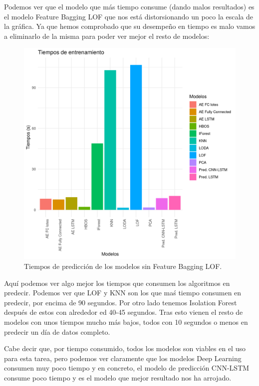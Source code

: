 Podemos ver que el modelo que más tiempo consume (dando malos resultados) es el modelo Feature Bagging LOF que nos está distorsionando un poco la escala de la gráfica. Ya que hemos comprobado que su desempeño en tiempo es malo vamos a eliminarlo de la misma para poder ver mejor el resto de modelos:

\begin{figure}[H]
	\centering
	\includegraphics[scale=0.65]{imagenes/tiempos_prediccion2.png}
	\caption{Tiempos de predicción de los modelos sin Feature Bagging LOF.}
	\label{img:tiempos-prediccion2}
\end{figure}

Aquí podemos ver algo mejor los tiempos que consumen los algoritmos en predecir. Podemos ver que LOF y KNN son los que maś tiempo consumen en predecir, por encima de 90 segundos. Por otro lado tenemos Isolation Forest después de estos con alrededor ed 40-45 segundos. Tras esto vienen el resto de modelos con unos tiempos mucho más bajos, todos con 10 segundos o menos en predecir un día de datos completo. 

Cabe decir que, por tiempo consumido, todos los modelos son viables en el uso para esta tarea, pero podemos ver claramente que los modelos Deep Learning consumen muy poco tiempo y en concreto, el modelo de predicción CNN-LSTM consume poco tiempo y es el modelo que mejor resultado nos ha arrojado.

